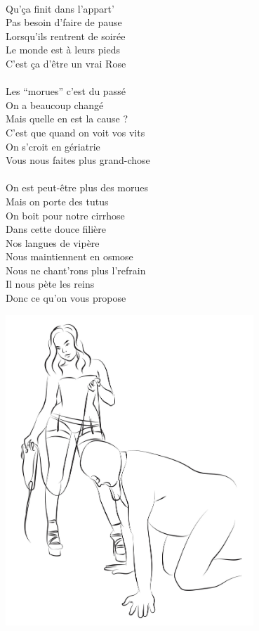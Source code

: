 {\\Qu’ça finit dans l’appart’
\\Pas besoin d’faire de pause
\\Lorsqu’ils rentrent de soirée
\\Le monde est à leurs pieds
\\C’est ça d’être un vrai Rose
\\\\Les “morues” c’est du passé
\\On a beaucoup changé
\\Mais quelle en est la cause ? 
\\C’est que quand on voit vos vits
\\On s’croit en gériatrie
\\Vous nous faites plus grand-chose
\\\\On est peut-être plus des morues
\\Mais on porte des tutus
\\On boit pour notre cirrhose 
\\Dans cette douce filière 
\\Nos langues de vipère 
\\Nous maintiennent en osmose 
\\Nous ne chant'rons plus l'refrain
\\Il nous pète les reins
\\Donc ce qu'on vous propose 
}

\begin{center}
\includegraphics[width=0.7\textwidth]{images/brev64.png}
\end{center}


\breakpage
